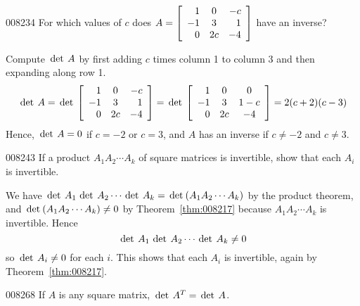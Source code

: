 \begin{example}{}{008234}
For which values of $c$ does $A = \left[ \begin{array}{rcr}
1 & 0 & -c \\
-1 & 3 & 1 \\
0 & 2c & -4
\end{array} \right]$ 
 have an inverse?

\begin{solution}
Compute $\thinspace\operatorname{det \medspace} A$ by first adding $c$ times column 1 to column 3 and then expanding along row 1.
\begin{equation*}
\thinspace\operatorname{det \medspace} A = \thinspace\operatorname{det\medspace} \left[ \begin{array}{rcr}
1 & 0 & -c \\
-1 & 3 & 1 \\
0 & 2c & -4
\end{array} \right]  = \thinspace\operatorname{det\medspace} \left[ \begin{array}{rcc}
1 & 0 & 0 \\
-1 & 3 & 1-c \\
0 & 2c & -4
\end{array} \right] = 2(c+2)(c-3) 
\end{equation*}
Hence, $\thinspace\operatorname{det \medspace} A = 0$ if $c = -2$ or $c = 3$, and $A$ has an inverse if $c \neq -2$ and $c \neq 3$.
\end{solution}
\end{example}

\begin{example}{}{008243}
If a product $A_1A_2\cdots A_k$ of square matrices is invertible, show that each $A_i$ is invertible.

\begin{solution}
 We have $\thinspace\operatorname{det \medspace}A_1\thinspace\operatorname{det \medspace}A_2\cdots \thinspace\operatorname{det \medspace}A_k = \thinspace\operatorname{det\medspace}(A_1A_2\cdots A_k)$ by the product theorem, and $\thinspace\operatorname{det\medspace}(A_1A_2\cdots A_k) \neq 0$ by Theorem~\ref{thm:008217} because $A_1A_2\cdots A_k$ is invertible. Hence
\begin{equation*}
\thinspace\operatorname{det \medspace} A_1 \thinspace\operatorname{det \medspace} A_2 \cdots \thinspace\operatorname{det \medspace} A_k \neq 0
\end{equation*}
so $\thinspace\operatorname{det \medspace} A_i \neq 0$ for each $i$. This shows that each $A_i$ is invertible, again by Theorem~\ref{thm:008217}.
\end{solution}
\end{example}

\begin{theorem}{}{008268}
If $A$ is any square matrix, $\thinspace\operatorname{det \medspace} A^T = \thinspace\operatorname{det \medspace} A$.
\end{theorem}

